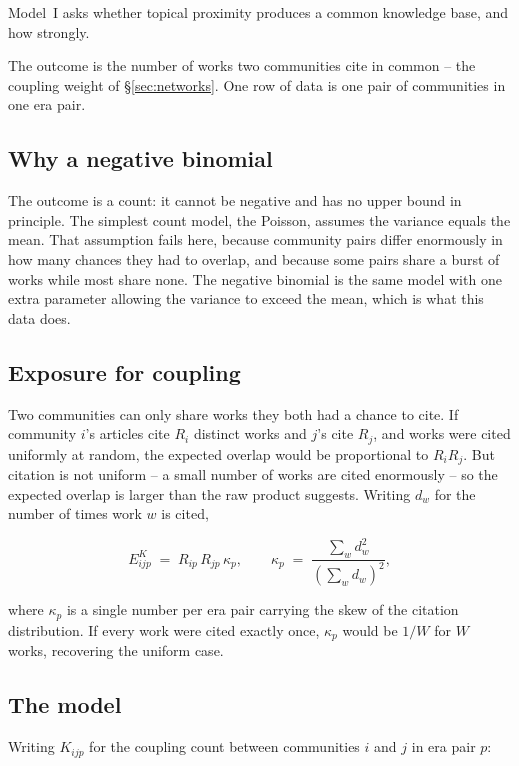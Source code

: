 \documentclass[11pt]{article}
\begin{document}
Model~I asks whether topical proximity produces a common knowledge base, and how strongly.

The outcome is the number of works two communities cite in common -- the coupling weight of
\S\ref{sec:networks}. One row of data is one pair of communities in one era pair.

\subsection{Why a negative binomial}

The outcome is a count: it cannot be negative and has no upper bound in principle. The
simplest count model, the Poisson, assumes the variance equals the mean. That assumption
fails here, because community pairs differ enormously in how many chances they had to
overlap, and because some pairs share a burst of works while most share none. The negative
binomial is the same model with one extra parameter allowing the variance to exceed the
mean, which is what this data does.

\subsection{Exposure for coupling}

Two communities can only share works they both had a chance to cite. If community $i$'s
articles cite $R_i$ distinct works and $j$'s cite $R_j$, and works were cited uniformly at
random, the expected overlap would be proportional to $R_iR_j$. But citation is not uniform
-- a small number of works are cited enormously -- so the expected overlap is larger than
the raw product suggests. Writing $d_w$ for the number of times work $w$ is cited,

\begin{equation}
E^{K}_{ijp} \;=\; R_{ip}\,R_{jp}\,\kappa_p,
\qquad
\kappa_p \;=\; \frac{\sum_w d_w^{2}}{\left(\sum_w d_w\right)^{2}},
\end{equation}

where $\kappa_p$ is a single number per era pair carrying the skew of the citation
distribution. If every work were cited exactly once, $\kappa_p$ would be $1/W$ for $W$
works, recovering the uniform case.

\subsection{The model}

Writing $K_{ijp}$ for the coupling count between communities $i$ and $j$ in era pair $p$:
\end{document}
